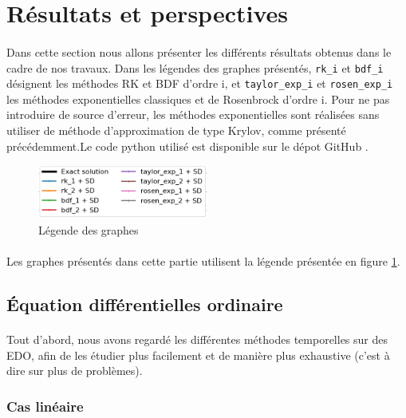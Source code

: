\section{Résultats et perspectives}
\paragraph{}
Dans cette section nous allons présenter les différents résultats obtenus dans le cadre de nos travaux. Dans les légendes des graphes présentés, \texttt{rk\_i} et \texttt{bdf\_i} désignent les méthodes RK et BDF d'ordre i, et \texttt{taylor\_exp\_i} et \texttt{rosen\_exp\_i} les méthodes exponentielles classiques et de Rosenbrock d'ordre i. Pour ne pas introduire de source d'erreur, les méthodes exponentielles sont réalisées sans utiliser de méthode d'approximation de type Krylov, comme présenté précédemment.Le code python utilisé est disponible sur le dépot GitHub \cite{repo_git}.
\begin{figure}
    \centering
    \includegraphics[width=0.5\textwidth]{images/results/legend.png}
    \caption{Légende des graphes}
    \label{fig:legend}
\end{figure}
\paragraph{}
Les graphes présentés dans cette partie utilisent la légende présentée en figure \ref{fig:legend}.


\subsection{Équation différentielles ordinaire}
    \paragraph{}
    Tout d'abord, nous avons regardé les différentes méthodes temporelles sur des EDO, afin de les étudier plus facilement et de manière plus exhaustive (c'est à dire sur plus de problèmes).
        
    \subsubsection{Cas linéaire}

